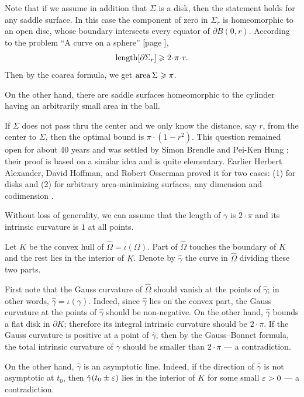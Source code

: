 Note that if we assume in addition that $\Sigma$ is a disk,
then the statement holds for any saddle surface.
In this case the component of zero in $\Sigma_r$ is homeomorphic to an open disc,
whose boundary intersects every equator of $\partial B(0,r)$.
According to the problem ``A curve on a sphere'' [page \pageref{A curve in a sphere}],
\[\length[\partial\Sigma_r]\ge 2\cdot\pi\cdot r.\]
Then by the coarea formula, we get $\operatorname{\rm area}\nolimits\Sigma\geqslant \pi$.

On the other hand, there are saddle surfaces homeomorphic to the cylinder having an arbitrarily small area in the ball.

If $\Sigma$ does not pass thru the center 
and we only know the distance, say $r$, 
from the center to $\Sigma$,
then the optimal bound is $\pi\cdot(1-r^2)$.
This question remained open for about 40 years and was settled by Simon Brendle and Pei-Ken Hung \cite{brende-hung};
their proof is based on a similar idea and is quite elementary.
Earlier Herbert Alexander, 
David Hoffman,
and Robert Osserman 
proved it for two cases: (1) for disks and (2) for arbitrary area-minimizing surfaces, any dimension and codimension
 \cite{alexander-osserman,alexander-hoffman-osserman}.






Without loss of generality, we can assume that the length of $\gamma$ is $2{\cdot}\pi$ and its intrinsic curvature is $1$ at all points.

Let $K$ be the convex hull of $\hat\Omega=\iota(\Omega)$.
Part of $\hat\Omega$ touches the boundary of $K$ and the rest lies in the interior of $K$.
Denote by $\hat\gamma$ the curve in $\hat\Omega$ dividing these two parts.

First note that the Gauss curvature of $\hat\Omega$ should vanish at the points of $\hat\gamma$;
in other words, $\hat\gamma=\iota(\gamma)$.
Indeed, since $\hat\gamma$ lies on the convex part, 
the Gauss curvature at the points of $\hat\gamma$ should be non-negative.
On the other hand, $\hat\gamma$ bounds a flat disk in $\partial K$;
therefore its integral intrinsic curvature should be $2{\cdot}\pi$.
If the Gauss curvature is positive at a point of $\hat\gamma$, 
then by the Gauss--Bonnet formula, the total intrinsic curvature of $\hat\gamma$ should be smaller than $2{\cdot}\pi$ --- a contradiction.

On the other hand, $\hat\gamma$ is an asymptotic line.
Indeed, if the direction of $\hat\gamma$ is not asymptotic at $t_0$,
then $\hat\gamma(t_0 \pm\varepsilon)$ lies in the interior of $K$ for some small $\varepsilon>0$ --- a contradiction.


